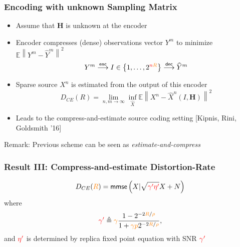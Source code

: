 \documentclass{beamer}
\newcommand{\mmse}{\mathsf{mmse}}
\newcommand{\Xc}{{\color{black} X}}
\newcommand{\rhoc}{{\color{orange} \rho}}
\newcommand{\pc}{{\color{orange} p}}
\newcommand{\Rc}{{\color{orange} R}}
\newcommand{\gammac}{{\color{orange} \gamma}}
\newcommand{\enc}{\mathsf{enc}}
\begin{document}
\begin{frame}
\frametitle{Encoding with unknown Sampling Matrix}
\begin{itemize}

\item Assume that $\mathbf H$ is unknown at the encoder
\item Encoder compresses (dense) observations vector $Y^m$ to minimize $\mathbb E\left\|Y^m - \widehat{Y}^m \right\|^2$
\[
Y^m \overset{\enc}{\longrightarrow} I \in \left\{1,\ldots,2^{{\color{red} n}\Rc} \right\} \overset{\mathsf{dec}}{\longrightarrow} \widehat{Y}^m
\]
\item Sparse source $X^n$ is estimated from the output of this encoder 
\[
D_{CE}(R) = \lim_{n,m\rightarrow \infty} \inf_{\widehat{X}} \mathbb E \left\|X^n - \widehat{X}^n \left(I,\mathbf H\right) \right\|^2
\]
\item Leads to the {\color{red} compress-and-estimate} source coding setting [Kipnis, Rini, Goldsmith '16]

\end{itemize}

\begin{exampleblock}{Remark:}
Previous scheme can be seen as \emph{estimate-and-compress} 
\end{exampleblock}
\end{frame}


\begin{frame}
\frametitle{Result III: Compress-and-estimate Distortion-Rate}
\begin{center}
\end{center}
\begin{theorem}
\[
D_{CE}(\Rc) = \mmse\left(\Xc | \sqrt{\color{red} \gamma' {\color{red} \eta'}}\Xc + N \right)
\]
where
\[
{\color{red}\gamma'} \triangleq \gammac \frac{1- 2^{-2{ \Rc / \rhoc} } }{1 + \gammac \pc 2^{-2 \Rc / \rhoc} },
\]
and ${\color{red} \eta'}$ is determined by replica fixed point equation with SNR ${\color{red}\gamma'}$
\end{theorem}
\end{frame}
\end{document}
